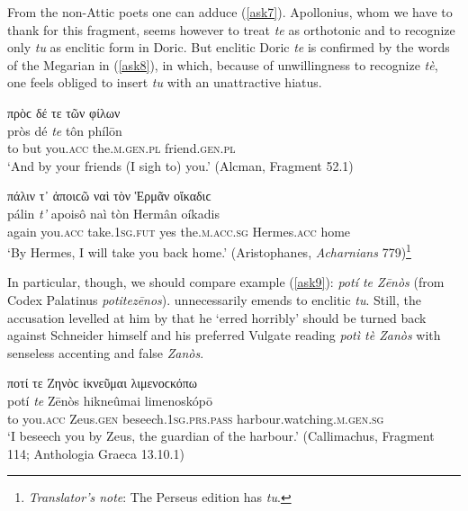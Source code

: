 From the non-Attic poets one can adduce (\ref{ask7}). Apollonius, whom we have to thank for this fragment, seems however to treat \textit{te} as orthotonic and to recognize only \textit{tu} as enclitic  form in Doric. But enclitic Doric \textit{te} is confirmed by the words of the Megarian in (\ref{ask8}), in which, because of unwillingness to recognize \textit{tè}, one feels obliged to insert \textit{tu} with an unattractive hiatus.

\begin{exe}
\ex πρὸϲ δέ τε τῶν φίλων\\
\gll pròs dé \emph{te} tôn phílōn\\
to but you.\textsc{acc} the.\textsc{m.gen.pl} friend.\textsc{gen.pl}\\
\trans `And by your friends (I sigh to) you.' (Alcman, Fragment 52.1)
\label{ask7}
\end{exe}

\begin{exe}
\ex πάλιν τ᾽ ἀποιϲῶ ναὶ τὸν Ἑρμᾶν οἴκαδιϲ\\
\gll pálin \emph{t'} apoisô naì tòn Hermân oíkadis\\
again you.\textsc{acc} take.\textsc{1sg.fut} yes the.\textsc{m.acc.sg}
Hermes.\textsc{acc} home\\
\trans `By Hermes, I will take you back home.' (Aristophanes, \textit{Acharnians} 779)\footnote{\emph{Translator's note}: The Perseus edition has \textit{tu}.}
\label{ask8}
\end{exe}

In particular, though, we should compare example (\ref{ask9}): \textit{potí te Zēnòs} (from Codex Palatinus \textit{potitezēnos}). \citet[234]{Blomfield1815} unnecessarily emends to enclitic \textit{tu}. Still, the accusation levelled at him by \citet[383]{Schneider1873} that he `erred horribly' should be turned back against Schneider himself and his preferred Vulgate reading \textit{potì tè Zanòs} with senseless accenting and false  \textit{Zanòs}.

\begin{exe}
\ex ποτί τε Ζηνὸϲ ἱκνεῦμαι λιμενοϲκόπω\\
\gll potí \emph{te} Zēnòs hikneûmai limenoskópō\\
to you.\textsc{acc} Zeus.\textsc{gen} beseech.\textsc{1sg.prs.pass}
harbour.watching.\textsc{m.gen.sg}\\
\trans `I beseech you by Zeus, the guardian of the harbour.' (Callimachus, Fragment 114; Anthologia Graeca 13.10.1)
\label{ask9}
\end{exe}


